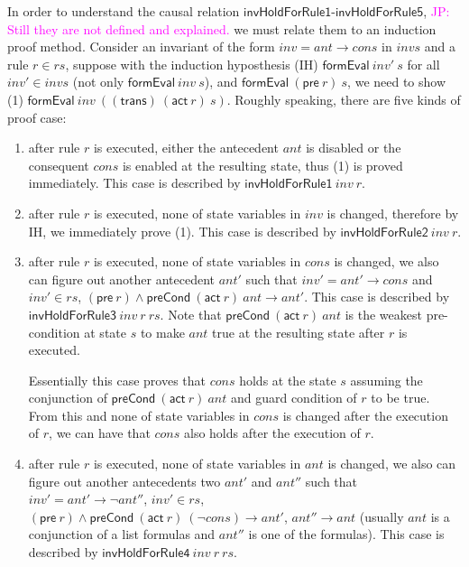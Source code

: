 \documentclass{llncs}
\newcommand\JP[1]{\textcolor{magenta}{JP: #1}}
\begin{document}
In order to understand the causal relation
$\mathsf{invHoldForRule1}$-$\mathsf{invHoldForRule5}$,
\JP{Still they are not defined and explained.}
we must relate them to an induction proof method.
Consider an invariant of the form $inv=ant \longrightarrow cons$ in $invs$ and a rule $r\in rs$,
suppose with the induction hyposthesis (IH)  $\mathsf{formEval}~ inv'~ s $ for all $inv'\in invs$ (not only  $\mathsf{formEval}~ inv~ s $),
and $\mathsf{formEval}~(\mathsf{pre}~r)~ s$,
we need to show (1) $\mathsf{formEval}~ inv~ ((\mathsf{trans})~(\mathsf{act}~r)~s) $.
Roughly speaking, there are five kinds of proof case:
%
 \begin{enumerate}
 \item after rule $r$ is executed,
either the antecedent $ant$ is disabled or the consequent $cons$ is enabled
at the resulting state, thus (1) is proved immediately.
This  case is described by $\mathsf{invHoldForRule1 }~inv~ r$.

\item after rule $r$ is executed,
none of state variables in $inv$ is changed,
therefore by IH, we immediately prove (1).
This  case is described by $\mathsf{invHoldForRule2}~inv~ r$.

\item after rule $r$ is executed, none of state variables in $cons$ is changed,
we also can figure out another antecedent $ant'$
such that $inv'=ant' \longrightarrow cons$ and $inv' \in rs$,
$(\mathsf{pre}~r )\wedge \mathsf{preCond}~(\mathsf{act}~r)~ant \longrightarrow  ant'$.
This  case is described by $\mathsf{invHoldForRule3}~inv~r~rs$.
Note that $\mathsf{preCond}~(\mathsf{act}~r)~ant$ is the weakest pre-condition at state $s$
to make $ant$ true at the resulting state after $r$ is executed.

Essentially this case proves that $cons$ holds at the state $s$
assuming the conjunction of  $\mathsf{preCond}~(\mathsf{act}~r)~ant$ and guard condition of $r$ to be true.
From this and none of state variables in $cons$ is changed after the execution of $r$,
we can have that $cons$ also holds after the execution of $r$.

\item after rule $r$ is executed, none of state variables in $ant$ is changed,
we also can figure out another antecedents two $ant'$ and $ant''$ such that
$inv'=ant' \longrightarrow \neg ant''$,
$inv' \in rs$, $(\mathsf{pre}~r )\wedge \mathsf{preCond}~(\mathsf{act}~r)~(\neg cons) \longrightarrow   ant'$,
$ant''\longrightarrow ant$ (usually $ant$ is a conjunction of a list formulas and $ant''$ is one of the formulas).
This  case is described by $\mathsf{invHoldForRule4}~inv~r~rs$.


\end{enumerate}
\end{document}
